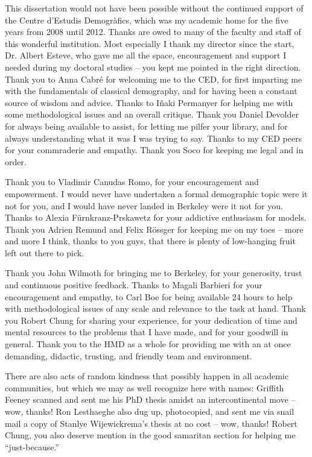 % 
This dissertation would not have been possible without the continued support of
the Centre d'Estudis Demogr\`{a}fics, which was my academic home for the five
years from 2008 until 2012. Thanks are owed to many of the faculty and
staff of this wonderful institution. Most especially I thank my director since
the start, Dr. Albert Esteve, who gave me all the space, encouragement and
support I needed during my doctoral studies -- you kept me pointed in the right
direction. Thank you to Anna Cabr\'{e} for welcoming me to the CED,
for first imparting me with the fundamentals of classical demography, and for
having been a constant source of wisdom and advice. Thanks to I\~{n}aki
Permanyer for helping me with some methodological issues and an overall critique. 
Thank you Daniel Devolder for always
being available to assist, for letting me pilfer your library, and for always
understanding what it was I was trying to say. Thanks to my CED peers for your
commraderie and empathy. Thank you Soco for keeping me legal and in
order.

Thank you to Vladimir Canudas Romo, for your encouragement and
empowerment. I would never have undertaken a formal demographic topic were it
not for you, and I would have never landed in Berkeley were it not for
you. Thanks to Alexia F\"{u}rnkranz-Prskawetz for your addictive enthusiasm for
models. Thank you Adrien Remund and Felix R\"{o}ssger for keeping me on my
toes -- more and more I think, thanks to you guys, that there is plenty of
low-hanging fruit left out there to pick.

Thank you John Wilmoth for bringing me to Berkeley, for your generosity, trust
and continuous positive feedback. Thanks to Magali Barbieri for your
encouragement and empathy, to Carl Boe for being available 24 hours to help with
methodological issues of any scale and relevance to the task at hand. Thank you
Robert Chung for sharing your experience, for your dedication of time
and mental resources to the problems that I have made, and for your goodwill in
general. Thank you to the HMD as a whole for providing me with an at once demanding,
didactic, trusting, and friendly team and environment.

There are also acts of random kindness that possibly happen in all academic
communities, but which we may as well recognize here with names: Griffith Feeney
scanned and sent me his PhD thesis amidst an intercontinental move -- wow,
thanks! Ron Lesthaeghe also dug up, photocopied, and sent me via snail mail a copy
of Stanlye Wijewickrema's thesis at no cost -- wow, thanks! Robert Chung, you
also deserve mention in the good samaritan section for helping me
``just-because.''

